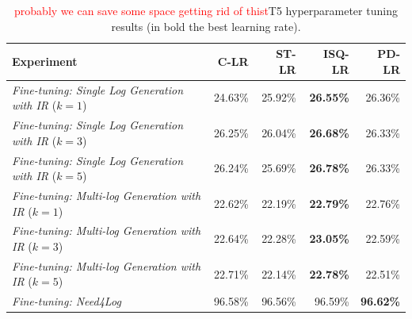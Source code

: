 \begin{table}[h!]
	\centering
	\caption{\textcolor{red}{probably we can save some space getting rid of thist}T5 hyperparameter tuning results (in bold the best learning rate).}
	\begin{tabular}{lrrrr}
		\toprule
		\textbf{Experiment}                  																		& \textbf{C-LR}              & \textbf{ST-LR}      & \textbf{ISQ-LR}        & \textbf{PD-LR} \\
		\midrule
		\textit{Fine-tuning: Single Log Generation with IR} ($k=1$)                         &   24.63\%                & 25.92\%    		           & \textbf{26.55\%}           &  26.36\%         \\
		\textit{Fine-tuning: Single Log Generation with IR} ($k=3$)                        &   26.25\%                & 26.04\%    		           & \textbf{26.68\%}          &  26.33\%         \\
		\textit{Fine-tuning: Single Log Generation with IR} ($k=5$)                         &  26.24\%                & 25.69\%    		           & \textbf{26.78\%}           &  26.33\%         \\
		\midrule
		\textit{Fine-tuning: Multi-log Generation with IR} ($k=1$)                         &   22.62\%                & 22.19\%    		           & \textbf{22.79\%}           &  22.76\%         \\
		\textit{Fine-tuning: Multi-log Generation with IR} ($k=3$)                        &   22.64\%                & 22.28\%    		           & \textbf{23.05\%}          &  22.59\%         \\
		\textit{Fine-tuning: Multi-log Generation with IR} ($k=5$)                         &   22.71\%                & 22.14\%    		           & \textbf{22.78\%}           &  22.51\%         \\
		\midrule
		\textit{Fine-tuning: Need4Log} & 96.58\%       & 96.56\%        & 96.59\%          & \textbf{96.62\%}\\
		\bottomrule
	\end{tabular}
	
	\label{tab:hp-results}
\end{table}



